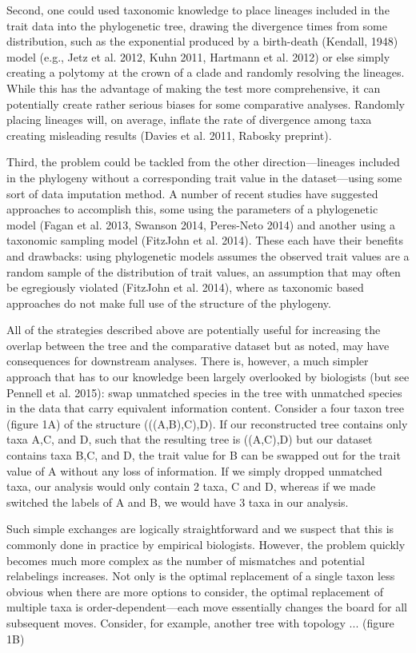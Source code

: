 \documentclass[a4paper,11pt]{article}
\begin{document}
Second, one could used taxonomic knowledge to place lineages included in the trait data into the phylogenetic tree, drawing the divergence times from some distribution, such as the exponential produced by a birth-death (Kendall, 1948) model (e.g., Jetz et al. 2012, Kuhn 2011, Hartmann et al. 2012) or else simply creating a polytomy at the crown of a clade and randomly resolving the lineages. While this has the advantage of making the test more comprehensive, it can potentially create rather serious biases for some comparative analyses. Randomly placing lineages will, on average, inflate the rate of divergence among taxa creating misleading results (Davies et al. 2011, Rabosky preprint).

Third, the problem could be tackled from the other direction---lineages included in the phylogeny without a corresponding trait value in the dataset---using some sort of data imputation method. A number of recent studies have suggested approaches to accomplish this, some using the parameters of a phylogenetic model (Fagan et al. 2013, Swanson 2014, Peres-Neto 2014) and another using a taxonomic sampling model (FitzJohn et al. 2014). These each have their benefits and drawbacks: using phylogenetic models assumes the observed trait values are a random sample of the distribution of trait values, an assumption that may often be egregiously violated (FitzJohn et al. 2014), where as taxonomic based approaches do not make full use of the structure of the phylogeny.

All of the strategies described above are potentially useful for increasing the overlap between the tree and the comparative dataset but as noted, may have consequences for downstream analyses. There is, however, a much simpler approach that has to our knowledge been largely overlooked by biologists (but see Pennell et al. 2015): swap unmatched species in the tree with unmatched species in the data that carry equivalent information content. Consider a four taxon tree (figure 1A) of the structure (((A,B),C),D). If our reconstructed tree contains only taxa A,C, and D, such that the resulting tree is ((A,C),D) but our dataset contains taxa B,C, and D, the trait value for B can be swapped out for the trait value of A without any loss of information. If we simply dropped unmatched taxa, our analysis would only contain 2 taxa, C and D, whereas if we made switched the labels of A and B, we would have 3 taxa in our analysis.

Such simple exchanges are logically straightforward and we suspect that this is commonly done in practice by empirical biologists. However, the problem quickly becomes much more complex as the number of mismatches and potential relabelings increases. Not only is the optimal replacement of a single taxon less obvious when there are more options to consider, the optimal replacement of multiple taxa is order-dependent---each move essentially changes the board for all subsequent moves. Consider, for example, another tree with topology ... (figure 1B)
\end{document}
